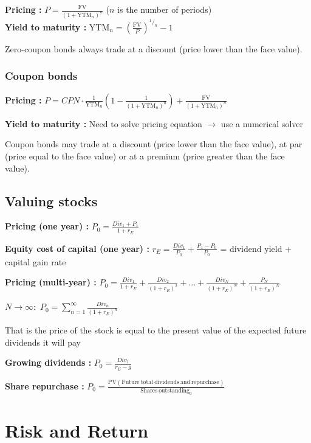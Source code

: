 \documentclass[a4paper,twocolumn]{article}
\newcommand{\PV} {\mathrm{PV}}
\newcommand{\YTM} {\mathrm{YTM}}
\newcommand{\FV} {\mathrm{FV}}
\begin{document}
\textbf{Pricing :} $P = \frac{\FV}{(1 + \YTM_n)^n}$ ($n$ is the number of periods)\\
\textbf{Yield to maturity :} $\YTM_n = \left( \frac{\FV}{P} \right)^{{}^1/_n} - 1$

Zero-coupon bonds always trade at a discount (price lower than the face value).

\subsubsection*{Coupon bonds}

\textbf{Pricing :} $P = CPN \cdot \frac{1}{\YTM_n} \left( 1 - \frac{1}{(1+\YTM_n)^n} \right) + \frac{\FV}{(1 + \YTM_n)^n}$

\textbf{Yield to maturity :} Need to solve pricing equation $\to$ use a numerical solver 

Coupon bonds may trade at a discount (price lower than the face value), at par (price equal to the face value) or at a premium (price greater than the face value).

\subsection*{Valuing stocks}

\textbf{Pricing (one year) :} $P_0 = \frac{Div_1 + P_1}{1 + r_E}$

\textbf{Equity cost of capital (one year) :} $r_E = \frac{Div_1}{P_0} + \frac{P_1 - P_0}{P_0}$ = dividend yield + capital gain rate

\textbf{Pricing (multi-year) :} $P_0 = \frac{Div_1}{1 + r_E} + \frac{Div_2}{(1 + r_E)^2} + ... + \frac{Div_N}{(1 + r_E)^N} + \frac{P_N}{(1 + r_E)^N}$

$N \to \infty : $ $P_0 = \sum_{n=1}^\infty \frac{Div_n}{(1 + r_E)^n}$ 

That is the price of the stock is equal to the present value of the expected future dividends it will pay

\textbf{Growing dividends :} $P_0 = \frac{Div_1}{r_E - g}$

\textbf{Share repurchase :} $P_0 = \frac{\PV(\mathrm{Future\ total\ dividends\ and\ repurchase})}{\mathrm{Shares\ outstanding}_0}$


\section*{Risk and Return}
\end{document}
